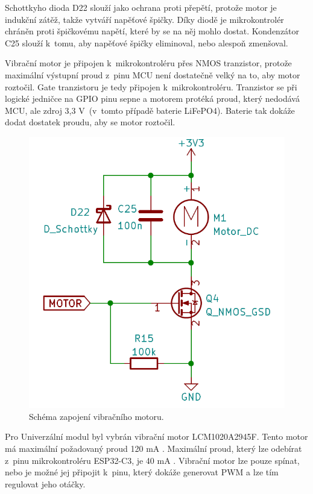 Schottkyho dioda D22 slouží jako ochrana proti přepětí, protože motor je indukční zátěž, takže vytváří napěťové špičky. Díky diodě je mikrokontrolér chráněn 
proti špičkovému napětí, které by se na něj mohlo dostat. Kondenzátor C25 slouží k~tomu, aby napěťové špičky eliminoval, nebo alespoň zmenšoval. 

Vibrační motor je připojen k~mikrokontroléru přes NMOS tranzistor, protože maximální výstupní proud z~pinu MCU není dostatečně velký na to, aby 
motor roztočil. Gate tranzistoru je tedy připojen k~mikrokontroléru. Tranzistor se při logické jedničce na GPIO pinu sepne a motorem protéká proud, který 
nedodává MCU, ale zdroj 3,3 V~(v~tomto případě baterie LiFePO4). Baterie tak dokáže dodat dostatek proudu, aby se motor roztočil. 

\begin{figure}[!h]
  \begin{center}
    \includegraphics[scale=0.4]{obrazky/Vibracni_motor.png}
  \end{center}
  \caption[Schéma zapojení vibračního motoru]{Schéma zapojení vibračního motoru.}
\end{figure}

Pro Univerzální modul byl vybrán vibrační motor LCM1020A2945F. Tento motor má maximální požadovaný proud 120 mA \cite{vib_motor_dtsh}. Maximální 
proud, který lze odebírat z~pinu mikrokontroléru ESP32-C3, je 40 mA \cite{ESP_C3_dtsh}. Vibrační motor lze pouze spínat, nebo je možné jej připojit 
k~pinu, který dokáže generovat PWM a lze tím regulovat jeho otáčky. 

